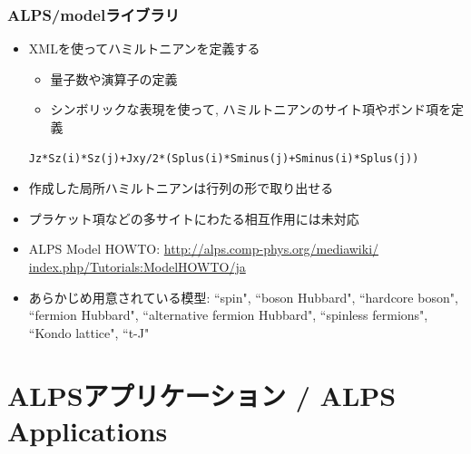 \begin{frame}[t,fragile]
  \frametitle{ALPS/modelライブラリ}
  \begin{itemize}
  \item XMLを使ってハミルトニアンを定義する
    \begin{itemize}  
    \item 量子数や演算子の定義
    \item シンボリックな表現を使って, ハミルトニアンのサイト項やボンド項を定義
    \end{itemize}
    \begin{lstlisting}
Jz*Sz(i)*Sz(j)+Jxy/2*(Splus(i)*Sminus(j)+Sminus(i)*Splus(j))
\end{lstlisting}
  \item 作成した局所ハミルトニアンは行列の形で取り出せる
  \item プラケット項などの多サイトにわたる相互作用には未対応
  \item ALPS Model HOWTO: {\small \href{http://alps.comp-phys.org/mediawiki/index.php/Tutorials:ModelHOWTO/ja}{http://alps.comp-phys.org/mediawiki/ index.php/Tutorials:ModelHOWTO/ja}}
  \item あらかじめ用意されている模型: ``spin", ``boson Hubbard", ``hardcore boson", ``fermion Hubbard", ``alternative fermion Hubbard", ``spinless fermions", ``Kondo lattice", ``t-J"
  \end{itemize}
\end{frame}



\section{ALPSアプリケーション / ALPS Applications}
\subsection*{\redb\whiteb\greenb}

